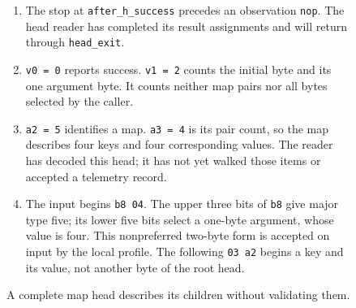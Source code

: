 \begin{figure}[htbp]
  \par\smallskip
  \begin{minipage}{\linewidth}
    \small
    \begin{enumerate}
      \setlength{\itemsep}{0pt}
            \setlength{\parsep}{0pt}
      \item The stop at \texttt{after\_h\_success} precedes an observation \texttt{nop}. The head reader has completed its result assignments and will return through \texttt{head\_exit}.
      \item \texttt{v0 = 0} reports success. \texttt{v1 = 2} counts the initial byte and its one argument byte. It counts neither map pairs nor all bytes selected by the caller.
      \item \texttt{a2 = 5} identifies a map. \texttt{a3 = 4} is its pair count, so the map describes four keys and four corresponding values. The reader has decoded this head; it has not yet walked those items or accepted a telemetry record.
      \item The input begins \texttt{b8 04}. The upper three bits of \texttt{b8} give major type five; its lower five bits select a one-byte argument, whose value is four. This nonpreferred two-byte form is accepted on input by the local profile. The following \texttt{03 a2} begins a key and its value, not another byte of the root head.
    \end{enumerate}
  \end{minipage}
  \caption{A complete map head describes its children without validating them.}
  \label{capture:032-cbor-telemetry-head-fields}
  \label{cbor-head-fields}
\end{figure}
\par
